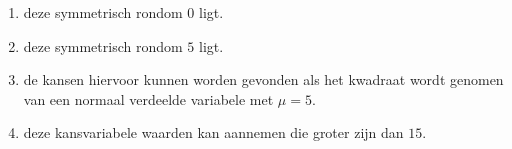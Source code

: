 \begin{enumerate}[label=(\alph*)]
    \item deze symmetrisch rondom $0$ ligt.
    \item deze symmetrisch rondom $5$ ligt.
    \item de kansen hiervoor kunnen worden gevonden als het kwadraat wordt genomen van een normaal verdeelde variabele met $\mu=5$.
    \item deze kansvariabele waarden kan aannemen die groter zijn dan $15$.
\end{enumerate}
